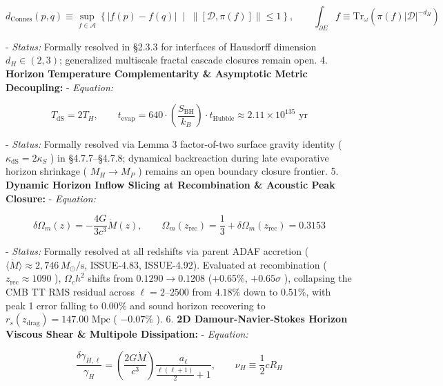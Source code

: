 \documentclass[11pt,a4paper]{article}
\theoremstyle{definition}\newtheorem{definition}{Definition}
\theoremstyle{remark}\newtheorem{remark}{Remark}
\begin{document}
\begin{equation}
d_{\text{Connes}}(p, q) \equiv \sup_{f \in \mathcal{A}} \left\{ |f(p) - f(q)| \;\middle|\; \|[\mathcal{D}, \pi(f)]\| \le 1 \right\}, \qquad \int_{\partial E} f \equiv \mathrm{Tr}_\omega\left(\pi(f)|\mathcal{D}|^{-d_H}\right)
\end{equation}


- \textit{Status:} Formally resolved in §2.3.3 for interfaces of Hausdorff dimension $d_H \in (2, 3)$; generalized multiscale fractal cascade closures remain open.
4. \textbf{Horizon Temperature Complementarity \& Asymptotic Metric Decoupling:}
- \textit{Equation:}


\begin{equation}
T_{\text{dS}} = 2 T_H, \qquad t_{\text{evap}} = 640 \cdot \left(\frac{S_{\text{BH}}}{k_B}\right) \cdot t_{\text{Hubble}} \approx 2.11 \times 10^{135} \text{ yr}
\end{equation}


- \textit{Status:} Formally resolved via Lemma 3 factor-of-two surface gravity identity ( $\kappa_{\text{dS}} = 2\kappa_S$ ) in §4.7.7–§4.7.8; dynamical backreaction during late evaporative horizon shrinkage ( $M_H \to M_P$ ) remains an open boundary closure frontier.
5. \textbf{Dynamic Horizon Inflow Slicing at Recombination \& Acoustic Peak Closure:}
- \textit{Equation:}


\begin{equation}
\delta\Omega_m(z) = -\frac{4G}{3c^3} \dot{M}(z), \qquad \Omega_m(z_{\text{rec}}) = \frac{1}{3} + \delta\Omega_m(z_{\text{rec}}) = 0.3153
\end{equation}


- \textit{Status:} Formally resolved at all redshifts via parent ADAF accretion ( $\langle\dot{M}\rangle \approx 2{,}746\,M_\odot/\text{s}$, ISSUE-4.83, ISSUE-4.92). Evaluated at recombination ( $z_{\text{rec}} \approx 1090$ ), $\Omega_c h^2$ shifts from $0.1290 \to 0.1208$ (+0.65\%, $+0.65\sigma$ ), collapsing the CMB TT RMS residual across $\ell = 2\text{--}2500$ from $4.18\%$ down to \textbf{$0.51\%$}, with peak 1 error falling to $0.00\%$ and sound horizon recovering to $r_s(z_{\text{drag}}) = 147.00\text{ Mpc}$ ( $-0.07\%$ ).
6. \textbf{2D Damour-Navier-Stokes Horizon Viscous Shear \& Multipole Dissipation:}
- \textit{Equation:}


\begin{equation}
\frac{\delta\gamma_{H, \ell}}{\gamma_H} = \left( \frac{2 G \dot{M}}{c^3} \right) \frac{a_\ell}{\frac{\ell(\ell + 1)}{2} + 1}, \qquad \nu_H \equiv \frac{1}{2} c R_H
\end{equation}
\end{document}
